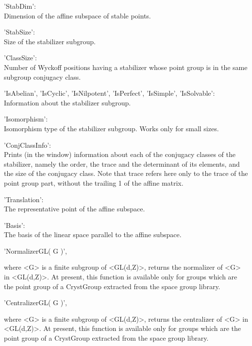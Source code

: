      'StabDim'\:: \\
          Dimension of the affine subspace of stable points.

     'StabSize'\:: \\
          Size of the stabilizer subgroup.

     'ClassSize'\:: \\
          Number of Wyckoff positions  having a  stabilizer  whose  point 
          group is in the same subgroup conjugacy class.

     'IsAbelian', 'IsCyclic', 'IsNilpotent', 'IsPerfect', 'IsSimple',
     'IsSolvable'\:: \\
          Information about the stabilizer subgroup.

     'Isomorphism'\:: \\
          Isomorphism type of the  stabilizer subgroup.  Works  only  for
          small sizes.

     'ConjClassInfo'\:: \\
          Prints  (in the {\GAP} window)  information  about each  of the 
          conjugacy  classes  of the  stabilizer,  namely the order,  the 
          trace and the determinant of its elements,  and the size of the  
          conjugacy class. Note that trace refers here only to the  trace
          of the point group part,  without the trailing 1 of the  affine
          matrix.

     'Translation'\:: \\ 
          The representative point of the affine subspace.

     'Basis'\:: \\
          The basis of the linear space parallel to the affine subspace.


%

'NormalizerGL( G )',

where <G>  is a finite subgroup of  <GL(d,Z)>, returns  the normalizer of
<G> in <GL(d,Z)>. At present, this  function is available only for groups
which are the point   group of a   CrystGroup   extracted from  the space
group library.

%

'CentralizerGL( G )',

where <G> is  a finite subgroup of <GL(d,Z)>,  returns the centralizer of
<G> in <GL(d,Z)>. At present, this function is  available only for groups
which  are the  point group  of a  CrystGroup   extracted from the  space
group library.

